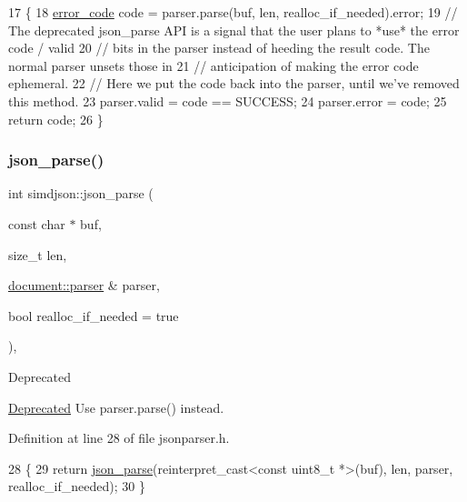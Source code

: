 \begin{DoxyCode}
17                                                                                                            
                 \{
18   \hyperlink{namespacesimdjson_a7b735a3a50ba79e3f7f14df5f77d8da9}{error\_code} code = parser.parse(buf, len, realloc\_if\_needed).error;
19   \textcolor{comment}{// The deprecated json\_parse API is a signal that the user plans to *use* the error code / valid}
20   \textcolor{comment}{// bits in the parser instead of heeding the result code. The normal parser unsets those in}
21   \textcolor{comment}{// anticipation of making the error code ephemeral.}
22   \textcolor{comment}{// Here we put the code back into the parser, until we've removed this method.}
23   parser.valid = code == SUCCESS;
24   parser.error = code;
25   \textcolor{keywordflow}{return} code;
26 \}
\end{DoxyCode}
\mbox{\label{namespacesimdjson_aaf12ce2bb0a7873455998e5bd8a2f207}} 
\subsubsection{\texorpdfstring{json\+\_\+parse()}{json\_parse()}\hspace{0.1cm}{\footnotesize\ttfamily [2/4]}}
{\footnotesize\ttfamily int simdjson\+::json\+\_\+parse (\begin{DoxyParamCaption}\item[{const char $\ast$}]{buf,  }\item[{size\+\_\+t}]{len,  }\item[{\hyperlink{classsimdjson_1_1document_1_1parser}{document\+::parser} \&}]{parser,  }\item[{bool}]{realloc\+\_\+if\+\_\+needed = {\ttfamily true} }\end{DoxyParamCaption})\hspace{0.3cm}{\ttfamily [inline]}, {\ttfamily [noexcept]}}

\begin{DoxyRefDesc}{Deprecated}
\item[\hyperlink{deprecated__deprecated000013}{Deprecated}]Use {\ttfamily parser.\+parse()} instead.\end{DoxyRefDesc}


Definition at line 28 of file jsonparser.\+h.


\begin{DoxyCode}
28                                                                                                            
              \{
29   \textcolor{keywordflow}{return} \hyperlink{namespacesimdjson_abda111a8c160cd422c8e5e6d2542f1eb}{json\_parse}(reinterpret\_cast<const uint8\_t *>(buf), len, parser, realloc\_if\_needed);
30 \}
\end{DoxyCode}
\mbox{\label{namespacesimdjson_a318618417b19957567c953ffe43532cb}} 

